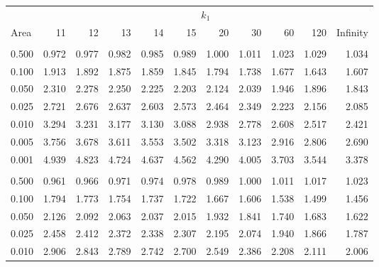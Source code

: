 \documentclass[
]{article}
\begin{document}
\begin{longtable}[t]{lrrrrrrrrrr}
\toprule
\multicolumn{1}{c}{ } & \multicolumn{10}{c}{$k_1$} \\
\cmidrule(l{3pt}r{3pt}){2-11}
Area & 11 & 12 & 13 & 14 & 15 & 20 & 30 & 60 & 120 & Infinity\\
\midrule
\addlinespace[0.3em]
\multicolumn{11}{l}{\textbf{$k_2=20$}}\\
\hspace{1em}0.500 & 0.972 & 0.977 & 0.982 & 0.985 & 0.989 & 1.000 & 1.011 & 1.023 & 1.029 & 1.034\\
\hspace{1em}0.100 & 1.913 & 1.892 & 1.875 & 1.859 & 1.845 & 1.794 & 1.738 & 1.677 & 1.643 & 1.607\\
\hspace{1em}0.050 & 2.310 & 2.278 & 2.250 & 2.225 & 2.203 & 2.124 & 2.039 & 1.946 & 1.896 & 1.843\\
\hspace{1em}0.025 & 2.721 & 2.676 & 2.637 & 2.603 & 2.573 & 2.464 & 2.349 & 2.223 & 2.156 & 2.085\\
\hspace{1em}0.010 & 3.294 & 3.231 & 3.177 & 3.130 & 3.088 & 2.938 & 2.778 & 2.608 & 2.517 & 2.421\\
\hspace{1em}0.005 & 3.756 & 3.678 & 3.611 & 3.553 & 3.502 & 3.318 & 3.123 & 2.916 & 2.806 & 2.690\\
\hspace{1em}0.001 & 4.939 & 4.823 & 4.724 & 4.637 & 4.562 & 4.290 & 4.005 & 3.703 & 3.544 & 3.378\\
\addlinespace[0.3em]
\multicolumn{11}{l}{\textbf{$k_2=30$}}\\
\hspace{1em}0.500 & 0.961 & 0.966 & 0.971 & 0.974 & 0.978 & 0.989 & 1.000 & 1.011 & 1.017 & 1.023\\
\hspace{1em}0.100 & 1.794 & 1.773 & 1.754 & 1.737 & 1.722 & 1.667 & 1.606 & 1.538 & 1.499 & 1.456\\
\hspace{1em}0.050 & 2.126 & 2.092 & 2.063 & 2.037 & 2.015 & 1.932 & 1.841 & 1.740 & 1.683 & 1.622\\
\hspace{1em}0.025 & 2.458 & 2.412 & 2.372 & 2.338 & 2.307 & 2.195 & 2.074 & 1.940 & 1.866 & 1.787\\
\hspace{1em}0.010 & 2.906 & 2.843 & 2.789 & 2.742 & 2.700 & 2.549 & 2.386 & 2.208 & 2.111 & 2.006\\

\end{longtable}
\end{document}
